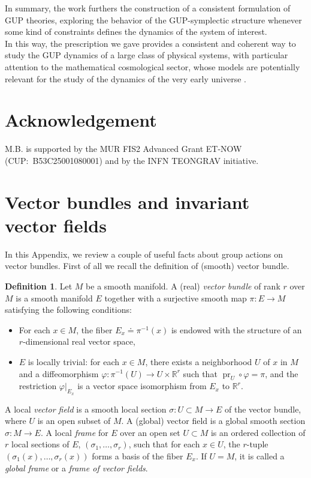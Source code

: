 \documentclass{article}
\numberwithin{equation}{section}
\theoremstyle{definition}
\newtheorem{definition}[theorem]{Definition}
\begin{document}
\smallskip

In summary, the work furthers the construction of a consistent formulation of GUP theories, exploring the behavior of the GUP-symplectic structure whenever some kind of constraints defines the dynamics of the system of interest.\\
In this way, the prescription we gave provides a consistent and coherent way to study the GUP dynamics of a large class of physical systems, with particular attention to the mathematical cosmological sector, whose models are potentially relevant for the study of the dynamics of the very early universe \cite{ellis2006bianchi}.


\section*{Acknowledgement}
M.B. is supported by the MUR FIS2 Advanced Grant ET-NOW (CUP:~B53C25001080001) and by the INFN TEONGRAV initiative.

\appendix
\section{Vector bundles and invariant vector fields}
\label{App:A}
In this Appendix, we review a couple of useful facts about group actions on vector bundles. First of all we recall the definition of (smooth) vector bundle.
\begin{definition}
Let $M$ be a smooth manifold. A (real) \emph{vector bundle} of rank $r$ over $M$ is a smooth manifold $E$ together with a surjective smooth map $\pi : E \to M$ satisfying the following conditions:
\begin{itemize}
    \item For each $x \in M$, the fiber $E_x \doteq \pi^{-1}(x)$ is endowed with the structure of an $r$-dimensional real vector space,
    \item $E$ is locally trivial: for each $x \in M$, there exists a neighborhood $U$ of $x$ in $M$ and a diffeomorphism $\varphi : \pi^{-1}(U) \to U \times \mathbb{R}^r$ such that $\operatorname{pr}_U \circ \varphi = \pi$, and the restriction $\varphi|_{E_x}$ is a vector space isomorphism from $E_x$ to $\mathbb{R}^r$.
\end{itemize}
\end{definition}
A local \emph{vector field} is a smooth local section $\sigma : U \subset M \to E$ of the vector bundle, where $U$ is an open subset of $M$. A (global) vector field is a global smooth section $\sigma : M \to E$. A local \emph{frame} for $E$ over an open set $U \subset M$ is an ordered collection of $r$ local sections of $E$, $(\sigma_1, \dots, \sigma_r)$, such that for each $x \in U$, the $r$-tuple $(\sigma_1(x), \dots, \sigma_r(x))$ forms a basis of the fiber $E_x$. If $U = M$, it is called a \emph{global frame} or a \emph{frame of vector fields}.
\end{document}

